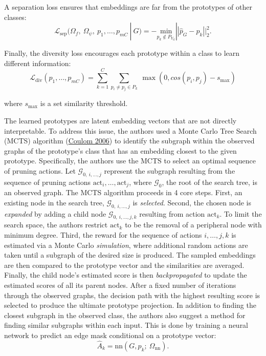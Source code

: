 \documentclass[
  11pt,
  letterpaper,
]{article}
\begin{document}
A separation loss ensures that embeddings are far from the prototypes of
other classes: \begin{equation}
    \mathcal{L}_{\text{sep}}(\Omega_f, \ \Omega_\psi, \ p_1, \dots, p_{mC} \ | \ G) = - \underset{p_k \notin P_{Y_G}}{\text{min}} || \hat p_G - p_k ||^2_2. 
\end{equation}

Finally, the diversity loss encourages each prototype within a class to
learn different information:\\
\begin{equation}
    \mathcal{L}_{\text{div}}(p_1, \dots, p_{mC}) = \sum_{k=1}^C \sum_{p_i \neq p_j \in P_k} \ \max(0, cos(p_i, p_j) - s_\text{max})
\end{equation}

where \(s_\text{max}\) is a set similarity threshold.

\quad The learned prototypes are latent embedding vectors that are not
directly interpretable. To address this issue, the authors used a Monte
Carlo Tree Search (MCTS) algorithm
(\protect\hyperlink{ref-Coulom2006EfficientSA}{Coulom 2006}) to identify
the subgraph within the observed graphs of the prototype's class that
has an embedding closest to the given prototype. Specifically, the
authors use the MCTS to select an optimal sequence of pruning actions.
Let \(\mathcal{G}_{0, \ i, \dots, j}\) represent the subgraph resulting
from the sequence of pruning actions
\(\text{act}_i,\dots, \text{act}_j\), where \(\mathcal{G}_0\), the root
of the search tree, is an observed graph. The MCTS algorithm proceeds in
4 core steps. First, an existing node in the search tree,
\(\mathcal{G}_{0, \ i, \dots, j}\) is \emph{selected}. Second, the
chosen node is \emph{expanded} by adding a child node
\(\mathcal{G}_{0, \ i, \dots, j, k}\) resulting from action
\(\text{act}_k\). To limit the search space, the authors restrict
\(\text{act}_k\) to be the removal of a peripheral node with minimum
degree. Third, the reward for the sequence of actions \(i, \dots, j, k\)
is estimated via a Monte Carlo \emph{simulation}, where additional
random actions are taken until a subgraph of the desired size is
produced. The sampled embeddings are then compared to the prototype
vector and the similarities are averaged. Finally, the child node's
estimated score is then \emph{backpropagated} to update the estimated
scores of all its parent nodes. After a fixed number of iterations
through the observed graphs, the decision path with the highest
resulting score is selected to produce the ultimate prototype
projection. In addition to finding the closest subgraph in the observed
class, the authors also suggest a method for finding similar subgraphs
within each input. This is done by training a neural network to predict
an edge mask conditional on a prototype vector:\\
\begin{equation}
    \hat A_k = \text{nn}\left(G, p_k; \ \Omega_{\text{nn}}\right).  
\end{equation}
\end{document}
